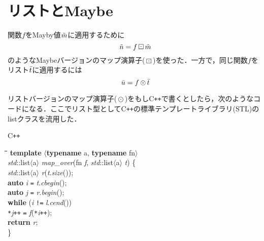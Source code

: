 \documentclass[twocolumn]{jsbook}
\newcommand{\programminglanguage}[1]{\textsf{#1}}
\newcommand{\cxx}{\programminglanguage{C}\texttt{++}}
\newenvironment{cxxcode}{\begin{itembox}[r]{\cxx}}{\end{itembox}}
\newenvironment{pythontab}{\begin{tabbing}\hspace*{1em}\=\hspace*{1em}\=\hspace*{1em}\=\hspace*{1em}\=\kill}{\end{tabbing}}
\newcommand{\pthnClassname}[1]{\textrm{#1}}
\newcommand{\pthnId}[1]{\textit{#1}}
\newcommand{\pthnKeyword}[1]{\textbf{#1}}
\newcommand{\pthnOp}[1]{\texttt{#1}}
\DeclareMathOperator{\hsklMap}{\odot}
\DeclareMathOperator{\hsklMaybeMap}{\boxdot}
\newcommand{\hsklList}[1]{\Bar{#1}}
\newcommand{\hsklMaybe}[1]{\Tilde{#1}}
\begin{document}

\section{リストとMaybe}

関数$f$をMayby値$\hsklMaybe{m}$に適用するために$$\hsklMaybe{n}=f\hsklMaybeMap\hsklMaybe{m}$$のようなMaybeバージョンのマップ演算子($\hsklMaybeMap$)を使った．一方で，同じ関数$f$をリスト$\hsklList{t}$に適用するには$$\hsklList{u}=f\hsklMap\hsklList{t}$$

リストバージョンのマップ演算子($\hsklMap$)をもし\cxx で書くとしたら，次のようなコードになる．ここでリスト型として\cxx の標準テンプレートライブラリ(STL)の\pthnClassname{list}クラスを流用した．
\begin{cxxcode}
\begin{pythontab}
\pthnKeyword{template} $\langle$\pthnKeyword{typename} \pthnClassname{a}, \pthnKeyword{typename} \pthnClassname{fn}$\rangle$\\
\pthnId{std}::\pthnClassname{list}$\langle$\pthnClassname{a}$\rangle$ \pthnId{map\_over}(\pthnClassname{fn} \pthnId{f}, \pthnId{std}::\pthnClassname{list}$\langle$\pthnClassname{a}$\rangle$ \pthnId{t}) \{\\
\>\pthnId{std}::\pthnClassname{list}$\langle$\pthnClassname{a}$\rangle$ \pthnId{r}(\pthnId{t}.\pthnId{size}());\\
\>\pthnKeyword{auto} \pthnId{i} \pthnOp{=} \pthnId{t}.\pthnId{cbegin}();\\
\>\pthnKeyword{auto} \pthnId{j} \pthnOp{=} \pthnId{r}.\pthnId{begin}();\\
\>\pthnKeyword{while} (\pthnId{i} \pthnOp{!=} \pthnId{l}.\pthnId{cend}())\\
\>\>\pthnOp{*}\pthnId{j}\pthnOp{++} \pthnOp{=} \pthnId{f}(\pthnOp{*}\pthnId{i}\pthnOp{++});\\
\>\pthnKeyword{return} \pthnId{r};\\
\}
\end{pythontab}
\end{cxxcode}
\end{document}
